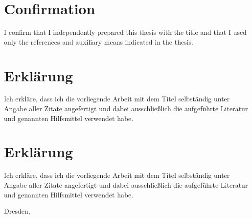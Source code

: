 \ifx\doclanguage\english
	\chapter*{Confirmation}
	I confirm that I independently prepared this thesis with the title 
	\emph{\doctitle}
	and that I used only the references and auxiliary means indicated in the thesis.

\fi
\ifx\doclanguage\german
	\chapter*{Erklärung}
	Ich erkläre, dass ich die vorliegende Arbeit mit dem Titel 
	\emph{\doctitle}
	selbständig unter Angabe aller Zitate angefertigt und dabei ausschließlich die aufgeführte Literatur und genannten Hilfsmittel verwendet habe.
\fi
\ifx\doclanguage\ngerman
	\chapter*{Erklärung}
	Ich erkläre, dass ich die vorliegende Arbeit mit dem Titel 
	\emph{\doctitle}
	selbständig unter Angabe aller Zitate angefertigt und dabei ausschließlich die aufgeführte Literatur und genannten Hilfsmittel verwendet habe.
\fi

\vspace{1.5cm}

\noindent
Dresden, \docdate

\vspace{3.0cm}

\noindent
\authorname

